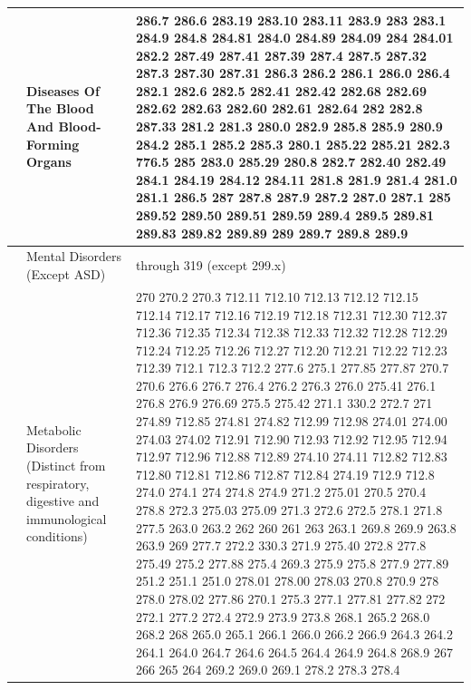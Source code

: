 \documentclass[3p,super,numbers,sort&compress,preprint,10pt]{elsarticle}
\begin{document}
\begin{longtable}{|L{.1in}|L{.6in}||L{5.65in}|}
   &  Diseases Of The Blood And Blood-Forming Organs &  286.7 286.6 283.19 283.10 283.11 283.9 283 283.1 284.9 284.8 284.81 284.0 284.89 284.09 284 284.01 282.2 287.49 287.41 287.39 287.4 287.5 287.32 287.3 287.30 287.31 286.3 286.2 286.1 286.0 286.4 282.1 282.6 282.5 282.41 282.42 282.68 282.69 282.62 282.63 282.60 282.61 282.64 282 282.8 287.33 281.2 281.3 280.0 282.9 285.8 285.9 280.9 284.2 285.1 285.2 285.3 280.1 285.22 285.21 282.3 776.5 285 283.0 285.29 280.8 282.7 282.40 282.49 284.1 284.19 284.12 284.11 281.8 281.9 281.4 281.0 281.1 286.5 287 287.8 287.9 287.2 287.0 287.1 285 289.52 289.50 289.51 289.59 289.4 289.5 289.81 289.83 289.82 289.89 289 289.7 289.8 289.9
  \\\hline
   & Mental Disorders (Except ASD) &  through 319 (except 299.x) \\\hline
   & Metabolic Disorders (Distinct from respiratory, digestive and immunological conditions) &  270 270.2 270.3 712.11 712.10 712.13 712.12 712.15 712.14 712.17 712.16 712.19 712.18 712.31 712.30 712.37 712.36 712.35 712.34 712.38 712.33 712.32 712.28 712.29 712.24 712.25 712.26 712.27 712.20 712.21 712.22 712.23 712.39 712.1 712.3 712.2 277.6 275.1 277.85 277.87 270.7 270.6 276.6 276.7 276.4 276.2 276.3 276.0 275.41 276.1 276.8 276.9 276.69 275.5 275.42 271.1 330.2 272.7 271 274.89 712.85 274.81 274.82 712.99 712.98 274.01 274.00 274.03 274.02 712.91 712.90 712.93 712.92 712.95 712.94 712.97 712.96 712.88 712.89 274.10 274.11 712.82 712.83 712.80 712.81 712.86 712.87 712.84 274.19 712.9 712.8 274.0 274.1 274 274.8 274.9 271.2 275.01 270.5 270.4 278.8 272.3 275.03 275.09 271.3 272.6 272.5 278.1 271.8 277.5 263.0 263.2 262 260 261 263 263.1 269.8 269.9 263.8 263.9 269 277.7 272.2 330.3 271.9 275.40 272.8 277.8 275.49 275.2 277.88 275.4 269.3 275.9 275.8 277.9 277.89 251.2 251.1 251.0 278.01 278.00 278.03 270.8 270.9 278 278.0 278.02 277.86 270.1 275.3 277.1 277.81 277.82 272 272.1 277.2 272.4 272.9 273.9 273.8 268.1 265.2 268.0 268.2 268 265.0 265.1 266.1 266.0 266.2 266.9 264.3 264.2 264.1 264.0 264.7 264.6 264.5 264.4 264.9 264.8 268.9 267 266 265 264 269.2 269.0 269.1 278.2 278.3 278.4\\\hline

\end{longtable}
\end{document}
